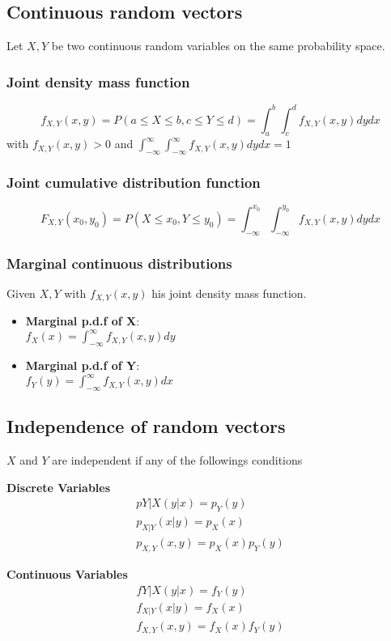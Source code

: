 \subsection{Continuous random vectors}
Let $X, Y$ be two continuous random variables on the same probability space.
\subsubsection{Joint density mass function}
\[ f_{X,Y}(x,y)=P(a\leq X \leq b, c\leq Y \leq d) = \int_{a}^b\int_{c}^d f_{X,Y}(x,y)dydx \]
with $f_{X,Y}(x,y)>0$ and $\int_{-\infty}^\infty\int_{-\infty}^\infty f_{X,Y}(x,y)dydx=1$
\subsubsection{Joint cumulative distribution function}
\[ F_{X,Y}(x_0,y_0)=P(X\leq x_0,Y\leq y_0) = \int_{-\infty}^{x_0}\int_{-\infty}^{y_0}f_{X,Y}(x,y)dydx \]
\subsubsection{Marginal continuous distributions}
Given $X, Y$ with $f_{X,Y}(x,y)$ his joint density mass function.
\begin{itemize}
    \item \textbf{Marginal p.d.f of X}:\\ $f_X(x)=\int_{-\infty}^\infty f_{X,Y}(x,y)dy$
    \item \textbf{Marginal p.d.f of Y}:\\ $f_Y(y)=\int_{-\infty}^\infty f_{X,Y}(x,y)dx$
\end{itemize}


\subsection{Independence of random vectors}
$X$ and $Y$ are independent if any of the followings conditions
\setlength{\columnseprule}{1pt}
\begin{multicols}{2}
    \textbf{Discrete Variables} \begin{multline*} 
        p{Y|X}(y|x)=p_Y(y)\\
        p_{X|Y}(x|y)=p_X(x)\\
        p_{X,Y}(x,y)=p_X(x)p_Y(y)
    \end{multline*}

    \textbf{Continuous Variables} \begin{multline*}
        f{Y|X}(y|x)=f_Y(y)\\
        f_{X|Y}(x|y)=f_X(x)\\
        f_{X,Y}(x,y)=f_X(x)f_Y(y)
    \end{multline*}
\end{multicols}

